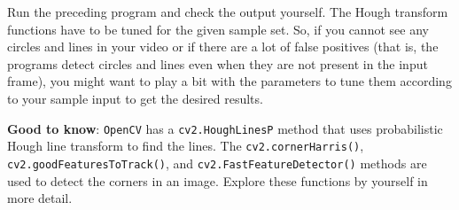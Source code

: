 \documentclass{labo}
\newcommand{\opencv}{\texttt{OpenCV} }
\begin{document}
\begin{leftbar}
Run the preceding program and check the output yourself. The Hough transform functions have to be tuned for the given sample set. So, if you cannot see any circles and lines in your video or if there are a lot of false positives (that is, the programs detect circles and lines even when they are not present in the input frame), you might want to play a bit with the parameters to tune them according to your sample input to get the desired results.
\end{leftbar}

\textbf{Good to know}: \opencv has a \texttt{cv2.HoughLinesP} method that uses probabilistic Hough line transform to find the lines. The \texttt{cv2.cornerHarris()}, \texttt{cv2.goodFeaturesToTrack()}, and \texttt{cv2.FastFeatureDetector()} methods are used to detect the corners in an image. Explore these functions by yourself in more detail.






\end{document}
